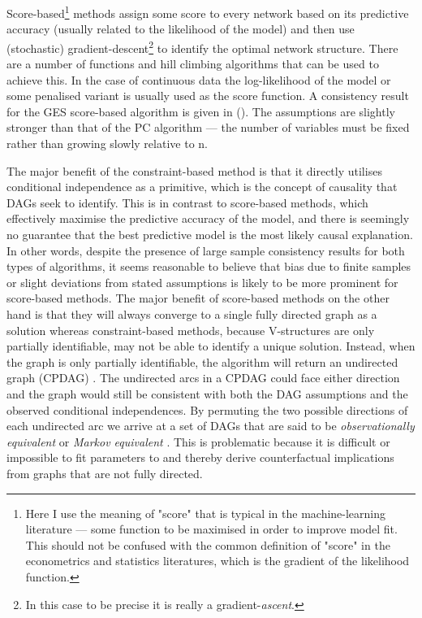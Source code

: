 \documentclass{article}
\begin{document}
Score-based\footnote{Here I use the meaning of "score" that is typical in the machine-learning literature --- some function to be maximised in order to improve model fit. This should not be confused with the common definition of "score" in the econometrics and statistics literatures, which is the gradient of the likelihood function.} methods assign some score to every network based on its predictive accuracy (usually related to the likelihood of the model) and then use (stochastic) gradient-descent\footnote{In this case to be precise it is really a gradient-\textit{ascent}.} to identify the optimal network structure. There are a number of functions and hill climbing algorithms that can be used to achieve this. In the case of continuous data the log-likelihood of the model or some penalised variant is usually used as the score function. A consistency result for the GES score-based algorithm is given in \citeauthor{chickering2002optimal} (\citeyear{chickering2002optimal}). The assumptions are slightly stronger than that of the PC algorithm --- the number of variables must be fixed rather than growing slowly relative to n.

The major benefit of the constraint-based method is that it directly utilises conditional independence as a primitive, which is the concept of causality that DAGs seek to identify. This is in contrast to score-based methods, which effectively maximise the predictive accuracy of the model, and there is seemingly no guarantee that the best predictive model is the most likely causal explanation. In other words, despite the presence of large sample consistency results for both types of algorithms, it seems reasonable to believe that bias due to finite samples or slight deviations from stated assumptions is likely to be more prominent for score-based methods. The major benefit of score-based methods on the other hand is that they will always converge to a single fully directed graph as a solution whereas constraint-based methods, because V-structures are only partially identifiable, may not be able to identify a unique solution. Instead, when the graph is only partially identifiable, the algorithm will return an undirected graph (CPDAG) \parencite{spirtes1991algorithm}. The undirected arcs in a CPDAG could face either direction and the graph would still be consistent with both the DAG assumptions and the observed conditional independences. By permuting the two possible directions of each undirected arc we arrive at a set of DAGs that are said to be \textit{observationally equivalent} or \textit{Markov equivalent} \parencite{colombo2014order}. This is problematic because it is difficult or impossible to fit parameters to and thereby derive counterfactual implications from graphs that are not fully directed.  
\end{document}
